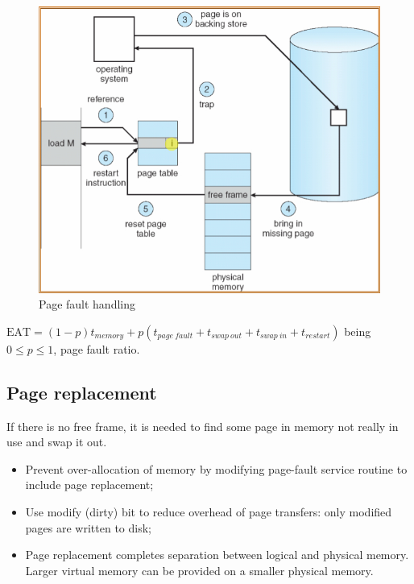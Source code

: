 \begin{figure}[hbtp]
\centering
\includegraphics[scale=0.4]{images/virtual_memory/page_fault.jpg}
\caption{Page fault handling}
\end{figure}

$\text{EAT} = (1-p) t_{memory} + p (t_{page\ fault} + t_{swap\ out} + t_{swap\ in} + t_{restart})$ being $ 0 \le p \le 1 $, page fault ratio.

\subsection{Page replacement}
If there is no free frame, it is needed to find some page in memory not really in use and swap it out.
\begin{itemize}
\item Prevent over-allocation of memory by modifying page-fault service routine to include page replacement;
\item Use modify (dirty) bit to reduce overhead of page transfers: only modified pages are written to disk;
\item Page replacement completes separation between logical and physical memory. Larger virtual memory can be provided on a smaller physical memory.
\end{itemize}

